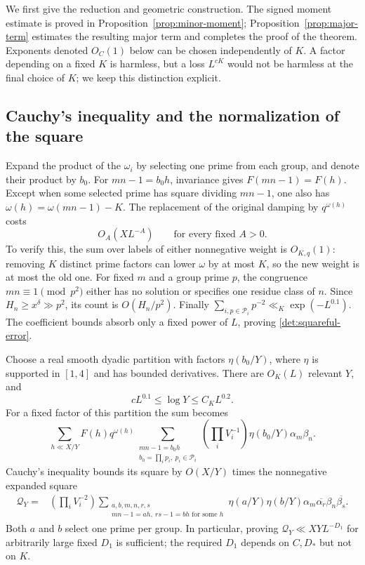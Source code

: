 We first give the reduction and geometric construction.  The signed
moment estimate is proved in Proposition~\ref{prop:minor-moment};
Proposition~\ref{prop:major-term} estimates the resulting major term
and completes the proof of the theorem.  Exponents denoted $O_C(1)$
below can be chosen independently of $K$.  A factor depending on a
fixed $K$ is harmless, but a loss $L^{cK}$ would not be harmless at
the final choice of $K$; we keep this distinction explicit.

\subsection{Cauchy's inequality and the normalization of the square}

Expand the product of the $\omega_i$ by selecting one prime from
each group, and denote their product by $b_0$.  For $mn-1=b_0h$,
invariance gives $F(mn-1)=F(h)$.  Except when some selected prime
has square dividing $mn-1$, one also has
$\omega(h)=\omega(mn-1)-K$.  The replacement of the original
damping by $q^{\omega(h)}$ costs
\begin{equation}\label{det:squareful-error}
 O_A(XL^{-A})\qquad\text{for every fixed }A>0.
\end{equation}
To verify this, the sum over labels of either nonnegative weight is
$O_{K,q}(1)$: removing $K$ distinct prime factors can lower $\omega$
by at most $K$, so the new weight is at most the old one.
For fixed $m$ and a group prime $p$, the congruence
$mn\equiv1\pmod {p^2}$ either has no solution or specifies one
residue class of $n$.  Since $H_n\geq x^\delta\gg p^2$, its count
is $O(H_n/p^2)$.  Finally
$\sum_{i,p\in\mathcal P_i}p^{-2}\ll_K\exp(-L^{0.1})$.
The coefficient bounds absorb only a fixed power of $L$, proving
\eqref{det:squareful-error}.

Choose a real smooth dyadic partition with factors $\eta(b_0/Y)$,
where $\eta$ is supported in $[1,4]$ and has bounded derivatives.
There are $O_K(L)$ relevant $Y$, and
\begin{equation}\label{det:Y-range}
 cL^{0.1}\leq\log Y\leq C_KL^{0.2}.
\end{equation}
For a fixed factor of this partition the sum becomes
\[
 \sum_{h\ll X/Y}F(h)q^{\omega(h)}
 \sum_{\substack{mn-1=b_0h\\b_0=\prod_i p_i,\ p_i\in\mathcal P_i}}
       \left(\prod_iV_i^{-1}\right)
       \eta(b_0/Y)\alpha_m\beta_n.
\]
Cauchy's inequality bounds its square by $O(X/Y)$ times the
nonnegative expanded square
\begin{equation}\label{det:cauchy-square}
 \begin{split}
 \mathcal Q_Y={}&\left(\prod_iV_i^{-2}\right)
 \sum_{\substack{a,b,m,n,r,s\\mn-1=ah,\ rs-1=bh\text{ for some }h}}
 \eta(a/Y)\eta(b/Y)
 \alpha_m\overline{\alpha_r}\beta_n\overline{\beta_s}.
 \end{split}
\end{equation}
Both $a$ and $b$ select one prime per group.  In particular, proving
$\mathcal Q_Y\ll XYL^{-D_1}$ for arbitrarily large fixed $D_1$
is sufficient; the required $D_1$ depends on $C,D_*$ but not on $K$.

